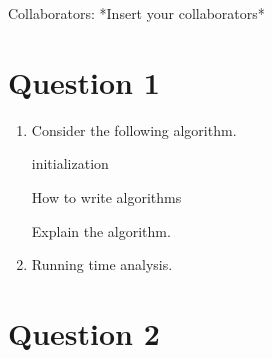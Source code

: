 \documentclass[11pt,letterpaper]{article}
\newcommand\collaborators{*Insert your collaborators*}
\begin{document}
Collaborators: \collaborators

\section*{Question 1}

\begin{enumerate}[label=(\alph*)]
  \item Consider the following algorithm.

  \begin{minipage}{\linewidth}
    \begin{algorithm}[H]
      \SetAlgoLined
      initialization\;
      \caption{How to write algorithms}
    \end{algorithm}
  \end{minipage}

Explain the algorithm.

  \item Running time analysis.
\end{enumerate}

\pagebreak
\section*{Question 2}
\end{document}
